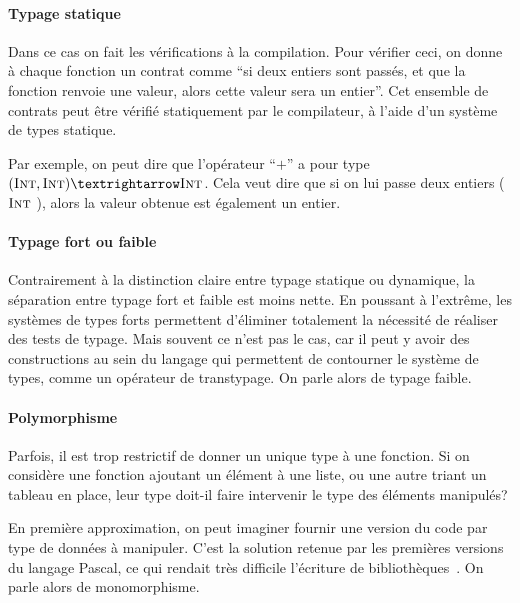 \paragraph{Typage statique}

Dans ce cas on fait les vérifications à la compilation. Pour vérifier ceci, on
donne à chaque fonction un contrat comme ``si deux entiers sont passés, et que
la fonction renvoie une valeur, alors cette valeur sera un entier''. Cet
ensemble de contrats peut être vérifié statiquement par le compilateur, à l'aide
d'un système de types statique.

Par exemple, on peut dire que l'opérateur ``$+$'' a pour type $(\tInt, \tInt) →
\tInt$. Cela veut dire que si on lui passe deux entiers ($\textsc{Int}$ \tInt), alors
la valeur obtenue est également un entier.

\paragraph{Typage fort ou faible}

Contrairement à la distinction claire entre typage statique ou dynamique, la
séparation entre typage fort et faible est moins nette. En poussant à l'extrême,
les systèmes de types forts permettent d'éliminer totalement la nécessité de
réaliser des tests de typage. Mais souvent ce n'est pas le cas, car il peut y
avoir des constructions au sein du langage qui permettent de contourner le
système de types, comme un opérateur de transtypage. On parle alors de typage
faible.

\paragraph{Polymorphisme}


Parfois, il est trop restrictif de donner un unique type à une fonction. Si on
considère une fonction ajoutant un élément à une liste, ou une autre
triant un tableau en place, leur type doit-il faire intervenir le type des
éléments manipulés?

En première approximation, on peut imaginer fournir une version du code par type
de données à manipuler. C'est la solution retenue par les premières versions du
langage Pascal, ce qui rendait très difficile l'écriture de
bibliothèques~\cite{PascalNoEscape}. On parle alors de monomorphisme.

